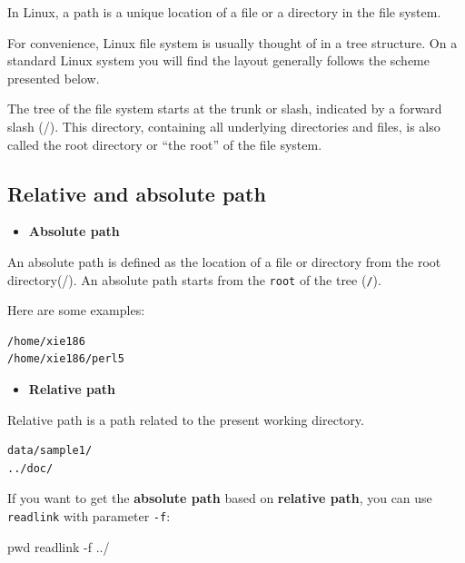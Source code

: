 \documentclass[]{book}
\makeatletter
\newenvironment{Shaded}{\begin{snugshade}}{\end{snugshade}}
\newcommand{\BuiltInTok}[1]{#1}
\newcommand{\FunctionTok}[1]{\textcolor[rgb]{0.00,0.00,0.00}{#1}}
\newcommand{\NormalTok}[1]{#1}
\providecommand{\tightlist}{%
  \setlength{\itemsep}{0pt}\setlength{\parskip}{0pt}}
\newenvironment{kframe}{%
\medskip{}
\setlength{\fboxsep}{.8em}
 \def\at@end@of@kframe{}%
 \ifinner\ifhmode%
  \def\at@end@of@kframe{\end{minipage}}%
  \begin{minipage}{\columnwidth}%
 \fi\fi%
 \def\FrameCommand##1{\hskip\@totalleftmargin \hskip-\fboxsep
 \colorbox{shadecolor}{##1}\hskip-\fboxsep
     \hskip-\linewidth \hskip-\@totalleftmargin \hskip\columnwidth}%
 \MakeFramed {\advance\hsize-\width
   \@totalleftmargin\z@ \linewidth\hsize
   \@setminipage}}%
 {\par\unskip\endMakeFramed%
 \at@end@of@kframe}
\renewenvironment{Shaded}{\begin{kframe}}{\end{kframe}}
\makeatother
\begin{document}
In Linux, a path is a unique location of a file or a directory in the file system.

For convenience, Linux file system is usually thought of in a tree structure. On a standard Linux system you will find the layout generally follows the scheme presented below.

The tree of the file system starts at the trunk or slash, indicated by a forward slash (/). This directory, containing all underlying directories and files, is also called the root directory or ``the root'' of the file system.

\hypertarget{relative-and-absolute-path}{%
\subsection{Relative and absolute path}\label{relative-and-absolute-path}}

\begin{itemize}
\tightlist
\item
  \textbf{Absolute path}
\end{itemize}

An absolute path is defined as the location of a file or directory from the root directory(/). An absolute path starts from the \texttt{root} of the tree (\texttt{/}).

Here are some examples:

\begin{verbatim}
/home/xie186
/home/xie186/perl5
\end{verbatim}

\begin{itemize}
\tightlist
\item
  \textbf{Relative path}
\end{itemize}

Relative path is a path related to the present working directory.

\begin{verbatim}
data/sample1/
../doc/
\end{verbatim}

If you want to get the \textbf{absolute path} based on \textbf{relative path}, you can use \texttt{readlink} with parameter \texttt{-f}:

\begin{Shaded}
\begin{Highlighting}[]
\BuiltInTok{pwd}
\FunctionTok{readlink}\NormalTok{ -f ../}
\end{Highlighting}
\end{Shaded}
\end{document}
